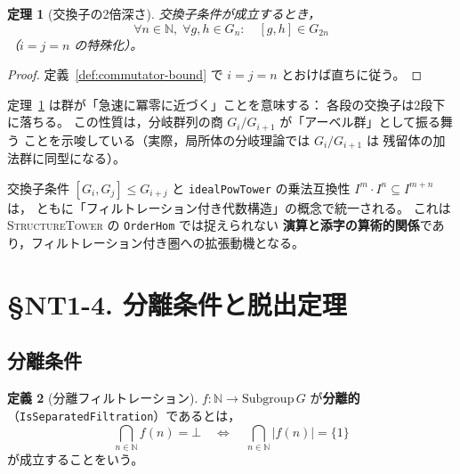 \documentclass[a4paper,11pt]{ltjsarticle}
\theoremstyle{definition}
\newtheorem{definition}{定義}[section]
\theoremstyle{plain}
\newtheorem{theorem}[definition]{定理}
\theoremstyle{remark}
\begin{document}
\begin{theorem}[交換子の2倍深さ]\label{thm:commutator-double-depth}
  交換子条件が成立するとき，
  \[
    \forall n \in \mathbb{N},\;\forall g,h \in G_n\colon
    \quad [g,h] \in G_{2n}
  \]
  （$i = j = n$ の特殊化）。
\end{theorem}

\begin{proof}
  定義~\ref{def:commutator-bound} で $i = j = n$ とおけば直ちに従う。
\end{proof}

\begin{mathinsight}
定理~\ref{thm:commutator-double-depth} は群が「急速に冪零に近づく」ことを意味する：
各段の交換子は2段下に落ちる。
この性質は，分岐群列の商 $G_i/G_{i+1}$ が「アーベル群」として振る舞う
ことを示唆している（実際，局所体の分岐理論では $G_i/G_{i+1}$ は
残留体の加法群に同型になる）。
\end{mathinsight}

\begin{mathinsight}
交換子条件 $[G_i,G_j] \leq G_{i+j}$ と
\texttt{idealPowTower} の乗法互換性 $I^m \cdot I^n \subseteq I^{m+n}$ は，
ともに「フィルトレーション付き代数構造」の概念で統一される。
これは \textsc{StructureTower} の \texttt{OrderHom} では捉えられない
\textbf{演算と添字の算術的関係}であり，フィルトレーション付き圏への拡張動機となる。
\end{mathinsight}

\section{§NT1-4. 分離条件と脱出定理}

\subsection{分離条件}

\begin{definition}[分離フィルトレーション]\label{def:separated-filtration}
  $f\colon \mathbb{N} \to \mathrm{Subgroup}\,G$ が\textbf{分離的}
  （\texttt{IsSeparatedFiltration}）であるとは，
  \[
    \bigcap_{n \in \mathbb{N}} f(n) = \bot
    \quad\Longleftrightarrow\quad
    \bigcap_{n \in \mathbb{N}} \lvert f(n)\rvert = \{1\}
  \]
  が成立することをいう。
\end{definition}
\end{document}
